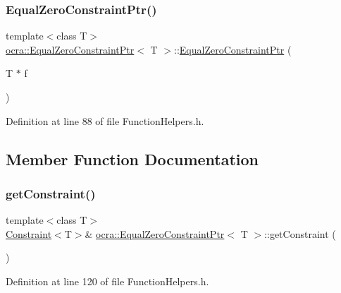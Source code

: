 \subsubsection{\texorpdfstring{Equal\+Zero\+Constraint\+Ptr()}{EqualZeroConstraintPtr()}\hspace{0.1cm}{\footnotesize\ttfamily [2/2]}}
{\footnotesize\ttfamily template$<$class T$>$ \\
\hyperlink{classocra_1_1EqualZeroConstraintPtr}{ocra\+::\+Equal\+Zero\+Constraint\+Ptr}$<$ T $>$\+::\hyperlink{classocra_1_1EqualZeroConstraintPtr}{Equal\+Zero\+Constraint\+Ptr} (\begin{DoxyParamCaption}\item[{T $\ast$}]{f }\end{DoxyParamCaption})\hspace{0.3cm}{\ttfamily [inline]}}



Definition at line 88 of file Function\+Helpers.\+h.



\subsection{Member Function Documentation}
\hypertarget{classocra_1_1EqualZeroConstraintPtr_a4d9b786f79ed2b84fac88e57f3d00404}{}\label{classocra_1_1EqualZeroConstraintPtr_a4d9b786f79ed2b84fac88e57f3d00404} 
\subsubsection{\texorpdfstring{get\+Constraint()}{getConstraint()}\hspace{0.1cm}{\footnotesize\ttfamily [1/2]}}
{\footnotesize\ttfamily template$<$class T$>$ \\
\hyperlink{classocra_1_1Constraint}{Constraint}$<$T$>$\& \hyperlink{classocra_1_1EqualZeroConstraintPtr}{ocra\+::\+Equal\+Zero\+Constraint\+Ptr}$<$ T $>$\+::get\+Constraint (\begin{DoxyParamCaption}{ }\end{DoxyParamCaption})\hspace{0.3cm}{\ttfamily [inline]}}



Definition at line 120 of file Function\+Helpers.\+h.

